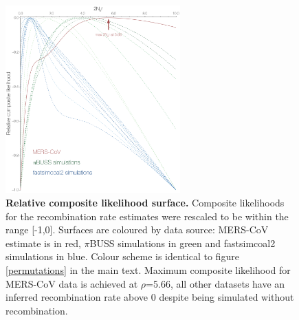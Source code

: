 \documentclass[11pt,oneside,letterpaper]{article}
\begin{document}
\begin{figure}[h]
	\centering	
	\includegraphics[width=0.6\textwidth]{figures/supp_MERS_compositeLikelihoods.png}
	\caption{\textbf{Relative composite likelihood surface.}
Composite likelihoods for the recombination rate estimates were rescaled to be within the range [-1,0].
Surfaces are coloured by data source: MERS-CoV estimate is in red, $\pi$BUSS simulations in green and fastsimcoal2 simulations in blue.
Colour scheme is identical to figure \ref{permutations} in the main text.
Maximum composite likelihood for MERS-CoV data is achieved at $\rho$=5.66, all other datasets have an inferred recombination rate above 0 despite being simulated without recombination.}
	\label{compLikelihoods}
\end{figure}
\end{document}
